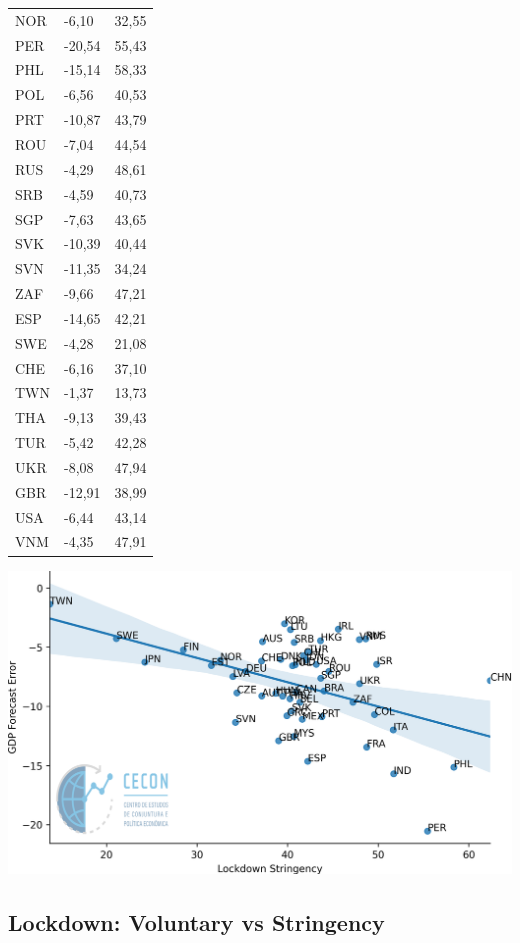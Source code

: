 \documentclass{SelfArx}
\begin{document}
\begin{table}[htbp]
\begin{tabular}{lll}
NOR & -6,10 & 32,55\\
PER & -20,54 & 55,43\\
PHL & -15,14 & 58,33\\
POL & -6,56 & 40,53\\
PRT & -10,87 & 43,79\\
ROU & -7,04 & 44,54\\
RUS & -4,29 & 48,61\\
SRB & -4,59 & 40,73\\
SGP & -7,63 & 43,65\\
SVK & -10,39 & 40,44\\
SVN & -11,35 & 34,24\\
ZAF & -9,66 & 47,21\\
ESP & -14,65 & 42,21\\
SWE & -4,28 & 21,08\\
CHE & -6,16 & 37,10\\
TWN & -1,37 & 13,73\\
THA & -9,13 & 39,43\\
TUR & -5,42 & 42,28\\
UKR & -8,08 & 47,94\\
GBR & -12,91 & 38,99\\
USA & -6,44 & 43,14\\
VNM & -4,35 & 47,91\\
\hline
\end{tabular}
\end{table}


\begin{center}
\includegraphics[width=.9\linewidth]{./figs/IMF/GDP_Lockdown.png}
\end{center}



\subsection*{Lockdown: Voluntary vs Stringency}
\label{sec:orgd801139}
\end{document}
